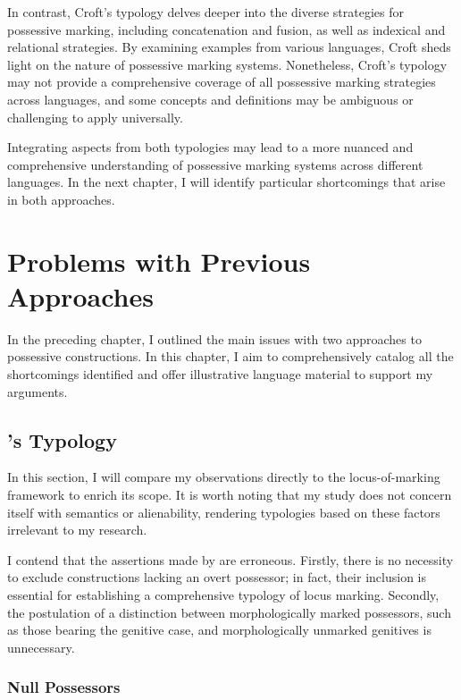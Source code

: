 In contrast, Croft's typology delves deeper into the diverse strategies for possessive marking, including concatenation and fusion, as well as indexical and relational strategies. By examining examples from various languages, Croft sheds light on the nature of possessive marking systems. Nonetheless, Croft's typology may not provide a comprehensive coverage of all possessive marking strategies across languages, and some concepts and definitions may be ambiguous or challenging to apply universally.

Integrating aspects from both typologies may lead to a more nuanced and comprehensive understanding of possessive marking systems across different languages. In the next chapter, I will identify particular shortcomings that arise in both approaches.

\section{Problems with Previous Approaches}

In the preceding chapter, I outlined the main issues with two approaches to possessive constructions. In this chapter, I aim to comprehensively catalog all the shortcomings identified and offer illustrative language material to support my arguments.

\subsection{\citeauthor{nichols_locus_2013}'s \citeyear{nichols_locus_2013} Typology}

In this section, I will compare my observations directly to the locus-of-marking framework to enrich its scope. It is worth noting that my study does not concern itself with semantics or alienability, rendering typologies based on these factors irrelevant to my research.

I contend that the assertions made by \cite{nichols_locus_2013} are erroneous. Firstly, there is no necessity to exclude constructions lacking an overt possessor; in fact, their inclusion is essential for establishing a comprehensive typology of locus marking. Secondly, the postulation of a distinction between morphologically marked possessors, such as those bearing the genitive case, and morphologically unmarked genitives is unnecessary.

\subsubsection{Null Possessors}

